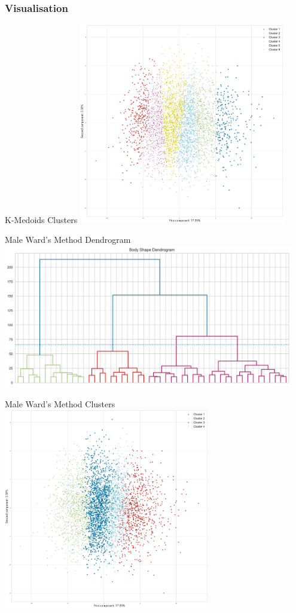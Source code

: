 \documentclass[10pt]{beamer}
\begin{document}
\subsubsection{Visualisation}
\begin{frame}{K-Medoids Clusters}
	\centering
	\includegraphics[width=0.675\textwidth]{../Images/MMedoidsProjection.png}
\end{frame}

\begin{frame}{Male Ward's Method Dendrogram}
	\centering
	\includegraphics[width=0.95\textwidth]{../Images/MDendrogram.png}
\end{frame}

\begin{frame}{Male Ward's Method Clusters}
	\centering
	\includegraphics[width=0.675\textwidth]{../Images/MHierProjection.png}
\end{frame}
\end{document}
